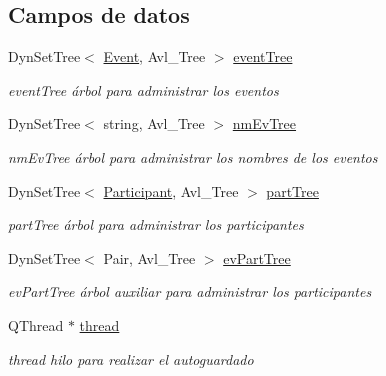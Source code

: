 \subsection*{Campos de datos}
\begin{DoxyCompactItemize}
\item 
Dyn\+Set\+Tree$<$ \hyperlink{class_event}{Event}, Avl\+\_\+\+Tree $>$ \hyperlink{class_main_window_adb0e2b6f47127b9bf6abea1f234cfd3a}{event\+Tree}\hypertarget{class_main_window_adb0e2b6f47127b9bf6abea1f234cfd3a}{}\label{class_main_window_adb0e2b6f47127b9bf6abea1f234cfd3a}

\begin{DoxyCompactList}\small\item\em event\+Tree árbol para administrar los eventos \end{DoxyCompactList}\item 
Dyn\+Set\+Tree$<$ string, Avl\+\_\+\+Tree $>$ \hyperlink{class_main_window_a12d4a98331022567be84fad64e556e2b}{nm\+Ev\+Tree}\hypertarget{class_main_window_a12d4a98331022567be84fad64e556e2b}{}\label{class_main_window_a12d4a98331022567be84fad64e556e2b}

\begin{DoxyCompactList}\small\item\em nm\+Ev\+Tree árbol para administrar los nombres de los eventos \end{DoxyCompactList}\item 
Dyn\+Set\+Tree$<$ \hyperlink{class_participant}{Participant}, Avl\+\_\+\+Tree $>$ \hyperlink{class_main_window_a905cefa1acba5185f4b4957b3827612a}{part\+Tree}\hypertarget{class_main_window_a905cefa1acba5185f4b4957b3827612a}{}\label{class_main_window_a905cefa1acba5185f4b4957b3827612a}

\begin{DoxyCompactList}\small\item\em part\+Tree árbol para administrar los participantes \end{DoxyCompactList}\item 
Dyn\+Set\+Tree$<$ Pair, Avl\+\_\+\+Tree $>$ \hyperlink{class_main_window_adb9534da17289cfe78255e4789d08fa6}{ev\+Part\+Tree}\hypertarget{class_main_window_adb9534da17289cfe78255e4789d08fa6}{}\label{class_main_window_adb9534da17289cfe78255e4789d08fa6}

\begin{DoxyCompactList}\small\item\em ev\+Part\+Tree árbol auxiliar para administrar los participantes \end{DoxyCompactList}\item 
Q\+Thread $\ast$ \hyperlink{class_main_window_ade8b47b8075af652cd79848b9a2268f3}{thread}\hypertarget{class_main_window_ade8b47b8075af652cd79848b9a2268f3}{}\label{class_main_window_ade8b47b8075af652cd79848b9a2268f3}

\begin{DoxyCompactList}\small\item\em thread hilo para realizar el autoguardado \end{DoxyCompactList}\end{DoxyCompactItemize}


